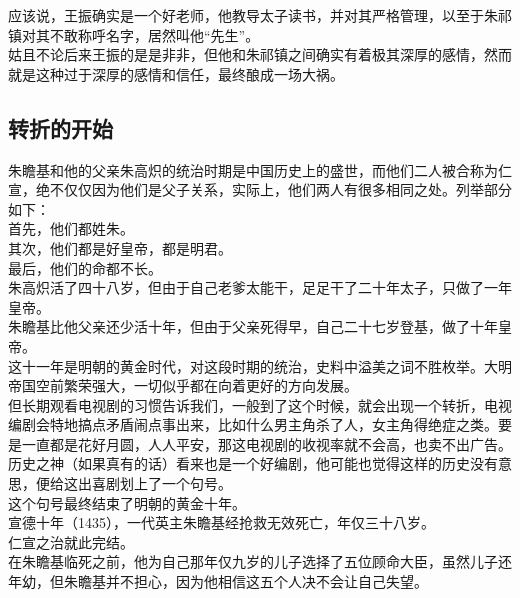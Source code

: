 \begin{multicols}{\theparacolNo}
应该说，王振确实是一个好老师，他教导太子读书，并对其严格管理，以至于朱祁镇对其不敢称呼名字，居然叫他“先生”。\\

姑且不论后来王振的是是非非，但他和朱祁镇之间确实有着极其深厚的感情，然而就是这种过于深厚的感情和信任，最终酿成一场大祸。\\

\subsection{转折的开始}
朱瞻基和他的父亲朱高炽的统治时期是中国历史上的盛世，而他们二人被合称为仁宣，绝不仅仅因为他们是父子关系，实际上，他们两人有很多相同之处。列举部分如下：\\

首先，他们都姓朱。\\

其次，他们都是好皇帝，都是明君。\\

最后，他们的命都不长。\\

朱高炽活了四十八岁，但由于自己老爹太能干，足足干了二十年太子，只做了一年皇帝。\\

朱瞻基比他父亲还少活十年，但由于父亲死得早，自己二十七岁登基，做了十年皇帝。\\

这十一年是明朝的黄金时代，对这段时期的统治，史料中溢美之词不胜枚举。大明帝国空前繁荣强大，一切似乎都在向着更好的方向发展。\\

但长期观看电视剧的习惯告诉我们，一般到了这个时候，就会出现一个转折，电视编剧会特地搞点矛盾闹点事出来，比如什么男主角杀了人，女主角得绝症之类。要是一直都是花好月圆，人人平安，那这电视剧的收视率就不会高，也卖不出广告。\\

历史之神（如果真有的话）看来也是一个好编剧，他可能也觉得这样的历史没有意思，便给这出喜剧划上了一个句号。\\

这个句号最终结束了明朝的黄金十年。\\

宣德十年（1435），一代英主朱瞻基经抢救无效死亡，年仅三十八岁。\\

仁宣之治就此完结。\\

在朱瞻基临死之前，他为自己那年仅九岁的儿子选择了五位顾命大臣，虽然儿子还年幼，但朱瞻基并不担心，因为他相信这五个人决不会让自己失望。\\


\end{multicols}
